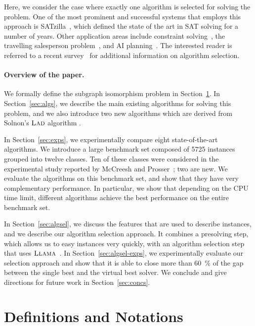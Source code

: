 \documentclass{llncs}
\newcommand{\LAD}{$\textsc{Lad}$\xspace}
\newcommand{\LLAMA}{$\textsc{Llama}$\xspace}
\begin{document}
Here, we consider the case where exactly one algorithm is selected for solving the problem. One of
the most prominent and successful systems that employs this approach is
SATzilla~\cite{xu_satzilla_2008}, which defined the state of the art in SAT solving for a number of
years. Other application areas include constraint solving~\cite{omahony_using_2008}, the travelling
salesperson problem~\cite{kotthoff_improving_2015}, and AI planning~\cite{seipp_learning_2012}.
The interested reader is referred to a recent survey~\cite{kotthoff_algorithm_2014} for additional
information on algorithm selection.

\paragraph{Overview of the paper.}
We formally define the subgraph isomorphism problem in Section~\ref{sec:defs}.
In Section~\ref{sec:algs}, we describe the main existing algorithms for solving
this problem, and we also introduce two new algorithms which are derived from
Solnon's \LAD algorithm \cite{Solnon:2010}.

In Section~\ref{sec:exps}, we experimentally compare eight state-of-the-art
algorithms. We introduce a large benchmark set composed of 5725 instances
grouped into twelve classes. Ten of these classes were considered in the
experimental study reported by McCreesh and Prosser~\cite{McCreesh:2015}; two
are new. We evaluate the algorithms on this benchmark set, and show that they
have very complementary performance. In particular, we show that depending on
the CPU time limit, different algorithms achieve the best performance on the
entire benchmark set.

In Section~\ref{sec:algsel}, we discuss the features that are used to describe
instances, and we describe our algorithm selection approach. It combines a
presolving step, which allows us to easy instances very quickly, with an
algorithm selection step that uses \LLAMA~\cite{kotthoff_llama_2013}.
In Section~\ref{sec:algsel-exps}, we experimentally evaluate our selection
approach and show that it is able to close more than \SI{60}{\percent} of the
gap between the single best and the virtual best solver. We conclude and give
directions for future work in Section~\ref{sec:concs}.

\section{Definitions and Notations}\label{sec:defs}
\end{document}
